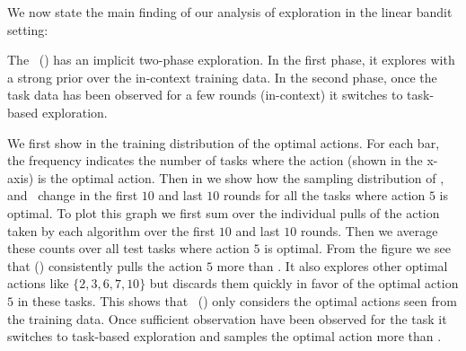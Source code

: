 



We now state the main finding of our analysis of exploration in the linear bandit setting:

\begin{tcolorbox}
\customfinding The \pred\ (\gt) has an implicit two-phase exploration. In the first phase, it explores with a strong prior over the in-context training data. In the second phase, once the task data has been observed for a few rounds (in-context) it switches to task-based exploration.
\end{tcolorbox}






We first show in  the training distribution of the optimal actions. For each bar, the frequency indicates the number of tasks where the action (shown in the x-axis) is the optimal action.
%
Then in  we show how the sampling distribution of \dptg, \pred\, and \predt\ change in the first $10$ and last $10$ rounds for all the tasks where action $5$ is optimal. To plot this graph we first sum over the individual pulls of the action taken by each algorithm over the first $10$ and last $10$ rounds. Then we average these counts over all test tasks where action $5$ is optimal. From the figure  we see that \pred (\gt) consistently pulls the action $5$ more than \dptg. It also explores other optimal actions like $\{2,3,6,7,10\}$ but discards them quickly in favor of the optimal action $5$ in these tasks. This shows that \pred\ (\gt) only considers the optimal actions seen from the training data. Once sufficient observation have been observed for the task it switches to task-based exploration and samples the optimal action more than \dptg.

